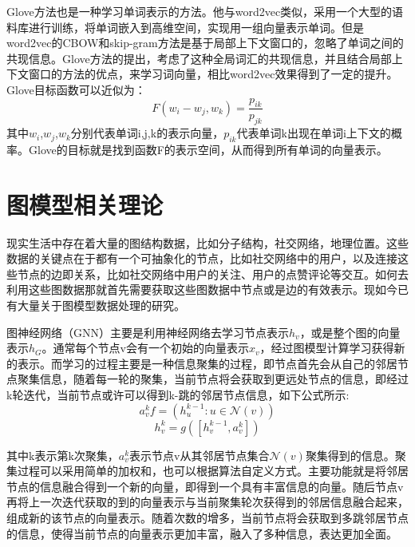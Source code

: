 Glove方法也是一种学习单词表示的方法。他与word2vec类似，采用一个大型的语料库进行训练，将单词嵌入到高维空间，实现用一组向量表示单词。但是word2vec的CBOW和skip-gram方法是基于局部上下文窗口的，忽略了单词之间的共现信息。Glove方法的提出，考虑了这种全局词汇的共现信息，并且结合局部上下文窗口的方法的优点，来学习词向量，相比word2vec效果得到了一定的提升。
Glove目标函数可以近似为：
\begin{equation}\label{CBOWFormula1}
	F\left(w_i-w_j,w_k\right)=\frac{p_{ik}}{p_{jk}}
\end{equation}
其中$w_i$,$w_j$,$w_k$分别代表单词i,j,k的表示向量，$p_{ik}$代表单词k出现在单词i上下文的概率。Glove的目标就是找到函数F的表示空间，从而得到所有单词的向量表示。
\section{图模型相关理论}
现实生活中存在着大量的图结构数据，比如分子结构，社交网络，地理位置。这些数据的关键点在于都有一个可抽象化的节点，比如社交网络中的用户，以及连接这些节点的边即关系，比如社交网络中用户的关注、用户的点赞评论等交互。如何去利用这些图数据那就首先需要获取这些图数据中节点或是边的有效表示。现如今已有大量关于图模型数据处理的研究。

图神经网络（GNN）主要是利用神经网络去学习节点表示$h_v$，或是整个图的向量表示$h_G$。通常每个节点v会有一个初始的向量表示$x_v$，经过图模型计算学习获得新的表示。而学习的过程主要是一种信息聚集的过程，即节点首先会从自己的邻居节点聚集信息，随着每一轮的聚集，当前节点将会获取到更远处节点的信息，即经过k轮迭代，当前节点或许可以得到k-跳的邻居节点信息，如下公式所示:
\begin{equation}\label{GNNFormula1}
	a_v^kf=\left(h_u^{k-1}:u\in\mathcal{N}\left(v\right)\right)
\end{equation}
\begin{equation}\label{GNNFormula2}
	h_v^k=g\left(\left[h_v^{k-1},a_v^k\right]\right)
\end{equation}

其中k表示第k次聚集，$a_v^k$表示节点v从其邻居节点集合$\mathcal{N}\left(v\right)$聚集得到的信息。聚集过程可以采用简单的加权和，也可以根据算法自定义方式。主要功能就是将邻居节点的信息融合得到一个新的向量，即得到一个具有丰富信息的向量。随后节点v再将上一次迭代获取的到的向量表示与当前聚集轮次获得到的邻居信息融合起来，组成新的该节点的向量表示。随着次数的增多，当前节点将会获取到多跳邻居节点的信息，使得当前节点的向量表示更加丰富，融入了多种信息，表达更加全面。


